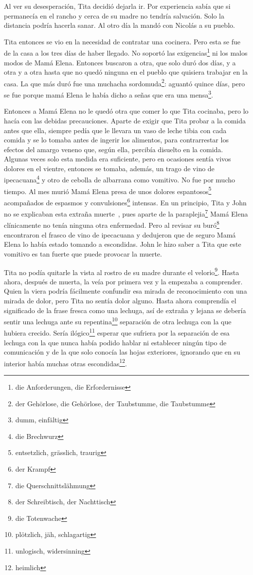 Al ver su desesperación, Tita decidió dejarla ir. Por experiencia sabía
que si permanecía en el rancho y cerca de su madre no tendría salvación.
Solo la distancia podría hacerla sanar. Al otro día la mandó con Nicolás
a su pueblo.

Tita entonces se vio en la necesidad de contratar una cocinera. Pero
esta se fue de la casa a los tres días de haber llegado. No soportó las exigencias\footnote{die Anforderungen, die Erfordernisse}
ni los malos modos de Mamá Elena. Entonces buscaron a otra,
que solo duró dos días, y a otra y a otra hasta que no quedó ninguna en el
pueblo que quisiera trabajar en la casa. La que más duró fue una
muchacha sordomuda\footnote{der Gehörlose, die Gehörlose, der Taubstumme, die Taubstumme}:
aguantó quince días, pero se fue porque mamá Elena le había dicho a
señas que era una mensa\footnote{dumm, einfältig}.

Entonces a Mamá Elena no le quedó otra que comer lo que Tita cocinaba,
pero lo hacía con las debidas precauciones. Aparte de exigir que Tita
probar a la comida antes que ella, siempre pedía que le llevara un vaso
de leche tibia con cada comida y se lo tomaba antes de ingerir los
alimentos, para contrarrestar los efectos del amargo veneno que, según
ella, percibía disuelto en la comida. Algunas veces solo esta medida era
suficiente, pero en ocasiones sentía vivos dolores en el vientre,
entonces se tomaba, además, un trago de vino de ipecacuana\footnote{die Brechwurz}
y otro de cebolla de albarrana como vomitivo. No fue por mucho tiempo. Al mes
murió Mamá Elena presa de unos dolores espantosos\footnote{entsetzlich, grässlich, traurig}
acompañados de espasmos y convulsiones\footnote{der Krampf}
intensas. En un principio, Tita y John no se
explicaban esta extraña muerte~, pues aparte de la paraplejia\footnote{die Querschnittslähmung} Mamá
Elena clínicamente no tenía ninguna otra enfermedad. Pero al revisar su buró\footnote{der Schreibtisch, der Nachttisch}
encontraron el frasco de vino de ipecacuana y dedujeron que de
seguro Mamá Elena lo había estado tomando a escondidas. John le hizo
saber a Tita que este vomitivo es tan fuerte que puede provocar la
muerte.

Tita no podía quitarle la vista al rostro de su madre durante el velorio\footnote{die Totenwache}. Hasta ahora, después de
muerta, la veía por primera vez y la empezaba a comprender. Quien la
viera podría fácilmente confundir esa mirada de reconocimiento con una
mirada de dolor, pero Tita no sentía dolor alguno. Hasta ahora comprendía
el significado de la frase \glqq{}fresca como una lechuga\grqq{}, así de extraña y
lejana se debería sentir una lechuga ante su repentina\footnote{plötzlich, jäh, schlagartig}
separación de otra lechuga con la que hubiera crecido. Sería ilógico\footnote{unlogisch, widersinning} esperar que sufriera
por la separación de esa lechuga con la que nunca había podido hablar
ni establecer ningún tipo de comunicación y de la que solo conocía las
hojas exteriores, ignorando que en su interior había muchas otras escondidas\footnote{heimlich}.

